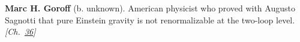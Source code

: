 \textbf{Marc H. Goroff} (b. unknown). American physicist who proved with Augusto Sagnotti that pure Einstein gravity is not renormalizable at the two-loop level. \emph{[Ch.~\hyperref[ch:qftvsgr]{36}]}

